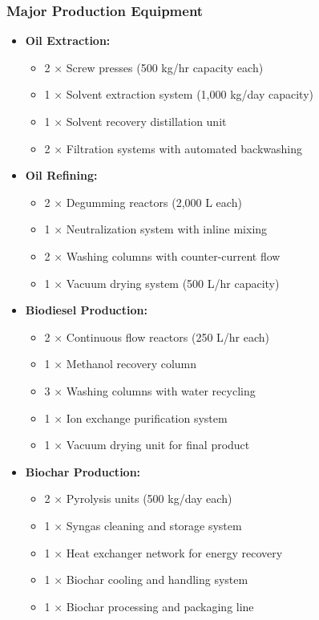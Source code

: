 \subsubsection{Major Production Equipment}
\begin{itemize}
    \item \textbf{Oil Extraction:}
    \begin{itemize}
        \item 2 × Screw presses (500 kg/hr capacity each)
        \item 1 × Solvent extraction system (1,000 kg/day capacity)
        \item 1 × Solvent recovery distillation unit
        \item 2 × Filtration systems with automated backwashing
    \end{itemize}
    
    \item \textbf{Oil Refining:}
    \begin{itemize}
        \item 2 × Degumming reactors (2,000 L each)
        \item 1 × Neutralization system with inline mixing
        \item 2 × Washing columns with counter-current flow
        \item 1 × Vacuum drying system (500 L/hr capacity)
    \end{itemize}
    
    \item \textbf{Biodiesel Production:}
    \begin{itemize}
        \item 2 × Continuous flow reactors (250 L/hr each)
        \item 1 × Methanol recovery column
        \item 3 × Washing columns with water recycling
        \item 1 × Ion exchange purification system
        \item 1 × Vacuum drying unit for final product
    \end{itemize}
    
    \item \textbf{Biochar Production:}
    \begin{itemize}
        \item 2 × Pyrolysis units (500 kg/day each)
        \item 1 × Syngas cleaning and storage system
        \item 1 × Heat exchanger network for energy recovery
        \item 1 × Biochar cooling and handling system
        \item 1 × Biochar processing and packaging line
    \end{itemize}
\end{itemize}


